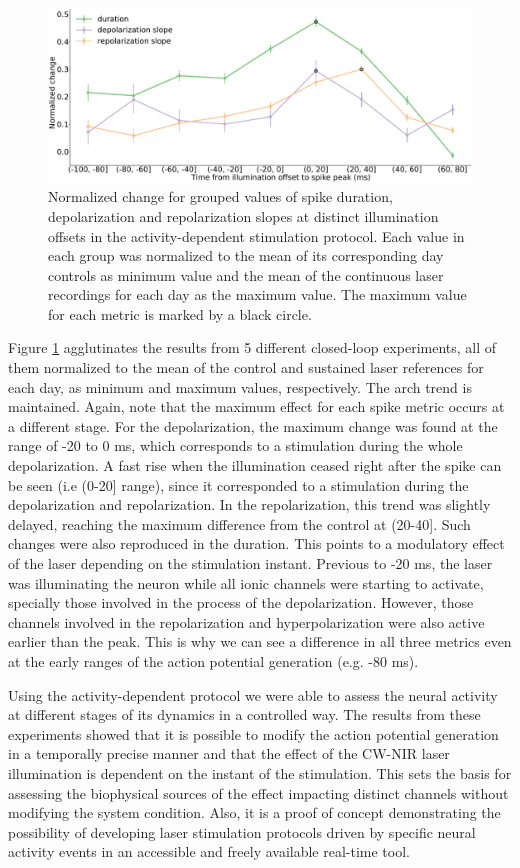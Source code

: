 \begin{figure}[htb!]
	\includegraphics[width=\textwidth]{img/laser/Figure7.pdf}
	\caption{Normalized change for grouped values of spike duration, depolarization and repolarization slopes at distinct illumination offsets in the activity-dependent stimulation protocol. Each value in each group was normalized to the mean of its corresponding day controls as minimum value and the mean of the continuous laser recordings for each day as the maximum value. The maximum value for each metric is marked by a black circle. }
	\label{fig:activity dependent error mean }
\end{figure}

Figure \ref{fig:activity dependent error mean } agglutinates the results from 5 different closed-loop experiments, all of them normalized to the mean of the control and sustained laser references for each day, as minimum and maximum values, respectively. The arch trend is maintained. Again, note that the maximum effect for each spike metric occurs at a different stage. For the depolarization, the maximum change was found at the range of -20 to 0 ms, which corresponds to a stimulation during the whole depolarization. A fast rise when the illumination ceased right after the spike can be seen (i.e (0-20] range), since it corresponded to a stimulation during the depolarization and repolarization. In the repolarization, this trend was slightly delayed, reaching the maximum difference from the control at (20-40]. Such changes were also reproduced in the duration. This points to a modulatory effect of the laser depending on the stimulation instant. Previous to -20 ms, the laser was illuminating the neuron while all ionic channels were starting to activate, specially those involved in the process of the depolarization. However, those channels involved in the repolarization and hyperpolarization were also active earlier than the peak. This is why we can see a difference in all three metrics even at the early ranges of the action potential generation (e.g. -80 ms).

Using the activity-dependent protocol we were able to assess the neural activity at different stages of its dynamics in a controlled way. The results from these experiments showed that it is possible to modify the action potential generation in a temporally precise manner and that the effect of the CW-NIR laser illumination is dependent on the instant of the stimulation. This sets the basis for assessing the biophysical sources of the effect impacting distinct channels without modifying the system condition. Also, it is a proof of concept demonstrating the possibility of developing laser stimulation protocols driven by specific neural activity events in an accessible and freely available real-time tool.
